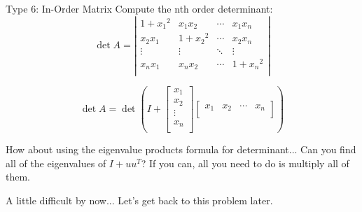 \documentclass{beamer}
\begin{document}
\begin{frame}{Type 6: In-Order Matrix}
    Compute the nth order determinant:
    \begin{equation*}
        \det A=\left| \begin{matrix}
        1+{x_1}^2&		x_1x_2&		\cdots&		x_1x_n\\
        x_2x_1&		1+{x_2}^2&		\cdots&		x_2x_n\\
        \vdots&		\vdots&		\ddots&		\vdots\\
        x_nx_1&		x_nx_2&		\cdots&		1+{x_n}^2\\
    \end{matrix} \right|
    \end{equation*}

    \begin{equation*}
        \det A=\det \left( I+\left[ \begin{array}{c}
            x_1\\
            x_2\\
            \vdots\\
            x_n\\
        \end{array} \right] \left[ \begin{matrix}
            x_1&		x_2&		\cdots&		x_n\\
        \end{matrix} \right] \right)
    \end{equation*}

    How about using the eigenvalue products formula for determinant... Can you find all of the eigenvalues of $I+uu^T$? If you can, all you need to do is multiply all of them.

    \vspace{3pt}
    A little difficult by now... Let's get back to this problem later.
\end{frame}
\end{document}
